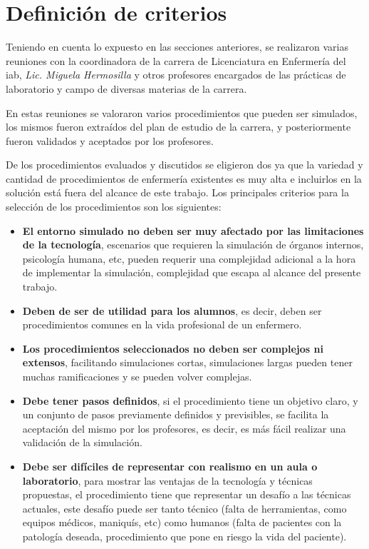 \section{Definición de criterios}
\label{sec:definicion_criterios}

Teniendo en cuenta lo expuesto en las secciones anteriores, se realizaron varias
reuniones con la coordinadora de la carrera de Licenciatura en Enfermería del
\Gls{iab}, \textit{Lic. Miguela Hermosilla} y otros profesores encargados de las
prácticas de laboratorio y campo de diversas materias de la carrera.

En estas reuniones se valoraron varios procedimientos que pueden ser simulados,
los mismos fueron extraídos del plan de estudio de la carrera, y posteriormente
fueron validados y aceptados por los profesores.

De los procedimientos evaluados y discutidos se eligieron dos ya que la variedad
y cantidad de procedimientos de enfermería existentes es muy alta e incluirlos
en la solución está fuera del alcance de este trabajo. Los principales criterios
para la selección de los procedimientos son los siguientes:

\begin{itemize}
\item \textbf{El entorno simulado no deben ser muy afectado por las limitaciones
        de la tecnología}, escenarios que requieren la simulación de órganos
    internos, psicología humana, etc, pueden requerir una complejidad adicional
    a la hora de implementar la simulación, complejidad que escapa al alcance
    del presente trabajo.
\item \textbf{Deben de ser de utilidad para los alumnos}, es decir, deben ser
    procedimientos comunes en la vida profesional de un enfermero. \item
    \textbf{Los procedimientos seleccionados no deben ser complejos ni
        extensos}, facilitando simulaciones cortas, simulaciones largas pueden
    tener muchas ramificaciones y se pueden volver complejas.
\item \textbf{Debe tener pasos definidos}, si el procedimiento tiene un objetivo claro,
    y un conjunto de pasos previamente definidos y previsibles, se facilita la
    aceptación del mismo por los profesores, es decir, es más fácil realizar una
    validación de la simulación.
\item \textbf{Debe ser difíciles de representar con realismo en un aula o
        laboratorio}, para mostrar las ventajas de la tecnología y técnicas
    propuestas, el procedimiento tiene que representar un desafío a las técnicas
    actuales, este desafío puede ser tanto técnico (falta de herramientas, como
    equipos médicos, maniquís, etc) como humanos (falta de pacientes con la
    patología deseada, procedimiento que pone en riesgo la vida del paciente).
\end{itemize}


